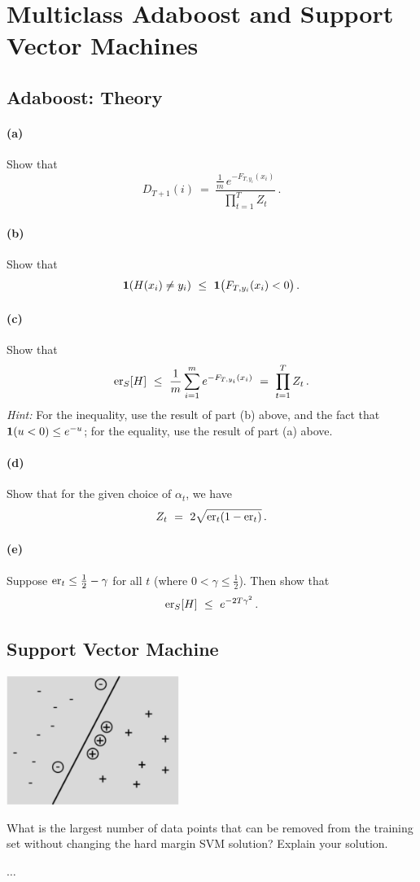 \section{Multiclass Adaboost and Support Vector Machines} 

\subsection{Adaboost: Theory}

\paragraph{(a)}
Show that
\[
D_{T+1}(i) ~ = ~ \frac{\frac{1}{m} \, e^{-F_{T,y_i}(x_i)}}{\prod_{t=1}^T Z_t}
	\,.
\] 


\paragraph{(b)}
Show that 
\[
{\mathbf 1}(H(x_i)\neq y_i) ~ \leq ~
	{\mathbf 1}\big( F_{T,y_i}(x_i) < 0 \big)
	\,.
\]

\paragraph{(c)}
Show that 
\[
\textup{\textrm{er}}_S[H] ~ \leq ~
	\frac{1}{m} \sum_{i=1}^m e^{-F_{T,y_i}(x_i)}
	~ = ~
	\prod_{t=1}^T Z_t
	\,.
\]
\emph{Hint:} For the inequality, use the 
result of part (b) above, 
and the fact that ${\mathbf 1}(u<0) \leq e^{-u}$; for the equality, use the result of part (a) above.

\paragraph{(d)}
Show that for the given choice of $\alpha_t$, we have 
\[
Z_t ~ = ~ 2 \sqrt{\textup{\textrm{er}}_t(1-\textup{\textrm{er}}_t)}
	\,.
\]
\paragraph{(e)}
Suppose $\textup{\textrm{er}}_{t} \leq \frac{1}{2} - \gamma$ for all $t$ (where $0 < \gamma \leq \frac{1}{2}$). Then show that 
\[
\textup{\textrm{er}}_S[H] ~ \leq ~ e^{-2T\gamma^2}
	\,.
\]

\subsection{Support Vector Machine}
\begin{center}
    \includegraphics[width=0.42\textwidth]{templates/SVM.png}
\end{center}
What is the largest number of data points that can be removed from the training set without changing the hard margin SVM solution? Explain your solution.

$\ldots$